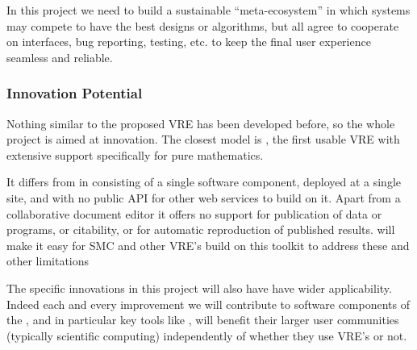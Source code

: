 In this project we need to build a sustainable ``meta-ecosystem'' in
which systems may compete to have the best designs or algorithms, but
all agree to cooperate on interfaces, bug reporting, testing, etc. to
keep the final user experience seamless and reliable.


\subsubsection{Innovation Potential}

Nothing similar to the proposed \TheProject VRE has been developed
before, so the whole project is aimed at innovation. 
The closest model
is \SMC, the first usable VRE with extensive support specifically for
pure mathematics.

%
%
It differs from \TheProject in consisting of a single software
component, deployed at a single site, and with no public API
for other web services to build on it.
Apart from a collaborative document editor it offers no support for
publication of data or programs, or citability, or for automatic
reproduction of published results.
\TheProject will make it easy for SMC and other VRE's build on this
toolkit to address these and other limitations

The specific innovations in this project will also have have wider
applicability. Indeed each and every improvement we will contribute to
software components of the \TheProject, and in particular key tools
like \Jupyter, will benefit their larger user communities (typically
scientific computing) independently of whether they use VRE's or not.



